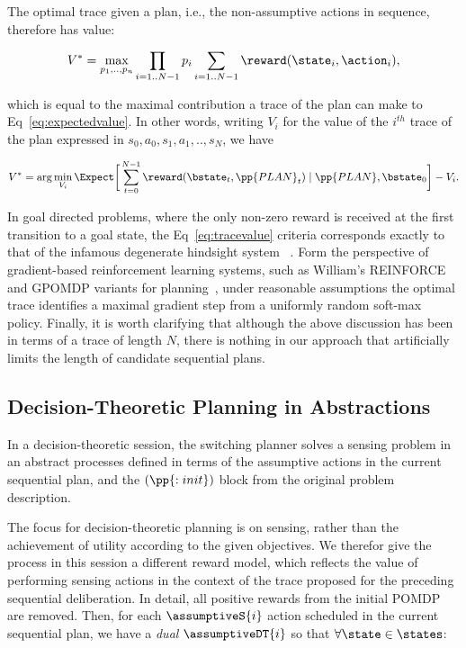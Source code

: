 \noindent The optimal trace given a plan, i.e., the non-assumptive
actions in sequence, therefore has value:

\[
V^* = \max_{p_1, .., p_n} \prod_{i=1..N-1} p_i \sum_{i=1..N-1}
\reward(\state_i, \action_i),
\]

\noindent which is equal to the maximal contribution a trace of the plan can
make to Eq~\ref{eq:expectedvalue}. In other words, writing $V_i$ for
the value of the $i^{th}$ trace of the plan expressed in $s_0, a_0,
s_1, a_1,.., s_N$, we have

\[
V^* = \arg\min_{V_i} \Expect \bigg{[} 
\sum_{t=0}^{N-1}  \reward(\bstate_t, \pp{PLAN}_t) \mid \pp{PLAN}, \bstate_0
\bigg{]} - V_i.
\]

In goal directed problems, where the only non-zero reward is received
at the first transition to a goal state, the Eq~\ref{eq:tracevalue}
criteria corresponds exactly to that of the infamous degenerate
hindsight system
~\cite{yoon:etal:2007}. Form the perspective of
gradient-based reinforcement learning systems, such as William's
REINFORCE and GPOMDP variants for planning~\cite{olivier:doug:2009},
under reasonable assumptions the optimal trace identifies a maximal
gradient step from a uniformly random soft-max policy. Finally, it is
worth clarifying that although the above discussion has been in terms
of a trace of length $N$, there is nothing in our approach that
artificially limits the length of candidate sequential plans.


\subsection{Decision-Theoretic Planning in Abstractions}

In a decision-theoretic session, the switching planner solves a sensing
problem in an abstract processes defined in terms of the assumptive
actions in the current sequential plan, and the $(\pp{:init})$ block
from the original problem description. 

The focus for decision-theoretic planning is on sensing, rather than
the achievement of utility according to the given objectives. We
therefor give the process in this session a different reward model, which
reflects the value of performing sensing actions in the context of the
trace proposed for the preceding sequential deliberation. In detail,
all positive rewards from the initial POMDP are removed. Then, for
each $\assumptiveS{i}$ action scheduled in the current sequential
plan, we have a {\em dual} $\assumptiveDT{i}$ so that
$\forall\state\in\states$:

